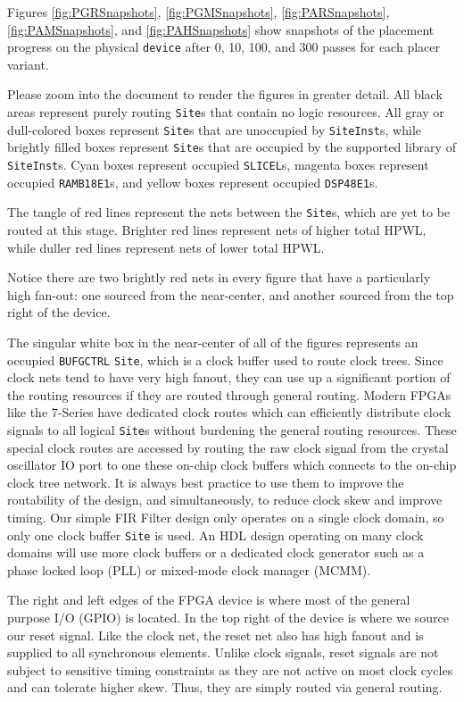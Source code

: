 \newpage
Figures \ref{fig:PGRSnapshots}, \ref{fig:PGMSnapshots}, \ref{fig:PARSnapshots}, \ref{fig:PAMSnapshots}, and \ref{fig:PAHSnapshots} show snapshots of the placement progress on the physical \texttt{device} after 0, 10, 100, and 300 passes for each placer variant.

Please zoom into the document to render the figures in greater detail.
All black areas represent purely routing \texttt{Site}s that contain no logic resources. 
All gray or dull-colored boxes represent \texttt{Site}s that are unoccupied by \texttt{SiteInst}s, while brightly filled boxes represent \texttt{Site}s that are occupied by the supported library of \texttt{SiteInst}s.
Cyan boxes represent occupied \texttt{SLICEL}s, magenta boxes represent occupied \texttt{RAMB18E1}s, and yellow boxes represent occupied \texttt{DSP48E1}s.

The tangle of red lines represent the nets between the \texttt{Site}s, which are yet to be routed at this stage. 
Brighter red lines represent nets of higher total HPWL, while duller red lines represent nets of lower total HPWL.

Notice there are two brightly red nets in every figure that have a particularly high fan-out:
one sourced from the near-center, and another sourced from the top right of the device. 

The singular white box in the near-center of all of the figures represents an occupied \texttt{BUFGCTRL} \texttt{Site}, which is a clock buffer used to route clock trees. 
Since clock nets tend to have very high fanout, they can use up a significant portion of the routing resources if they are routed through general routing.
Modern FPGAs like the 7-Series have dedicated clock routes which can efficiently distribute clock signals to all logical \texttt{Site}s without burdening the general routing resources.
These special clock routes are accessed by routing the raw clock signal from the crystal oscillator IO port to one these on-chip clock buffers which connects to the on-chip clock tree network.
It is always best practice to use them to improve the routability of the design, and simultaneously, to reduce clock skew and improve timing. 
Our simple FIR Filter design only operates on a single clock domain, so only one clock buffer \texttt{Site} is used. 
An HDL design operating on many clock domains will use more clock buffers or a dedicated clock generator such as a phase locked loop (PLL) or mixed-mode clock manager (MCMM).

The right and left edges of the FPGA device is where most of the general purpose I/O (GPIO) is located. 
In the top right of the device is where we source our reset signal. 
Like the clock net, the reset net also has high fanout and is supplied to all synchronous elements.
Unlike clock signals, reset signals are not subject to sensitive timing constraints as they are not active on most clock cycles and can tolerate higher skew.
Thus, they are simply routed via general routing.

